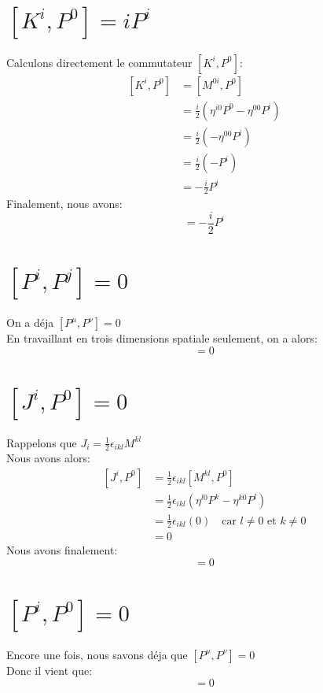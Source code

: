 \documentclass[12pt, a4paper]{article}
\begin{document}
 \section{\([K^{i},P^{0}]=iP^{i}\)}
 Calculons directement le commutateur \([K^{i},P^{0}]\):
 \begin{equation}
 	\begin{split}
 		[K^{i},P^{0}]
 		&=[M^{0i}, P^{0}]\\
 		&=\frac{i}{2}(\eta^{i0}P^{0}-\eta^{00}P^{i})\\
 		&=\frac{i}{2}(-\eta^{00}P^{i})\\
 		&=\frac{i}{2}(-P^{i})\\
 		&=-\frac{i}{2}P^{i}
 	\end{split}
\end{equation}
Finalement, nous avons: 
\begin{equation}
	[K^{i},P^{0}]=-\frac{i}{2}P^{i}
\end{equation}

\section{\([P^{i},P^{j}]=0\)}
On a déja \([P^{\mu},P^{\nu}]=0\)\\
En travaillant en trois dimensions spatiale seulement, on a alors: 
\begin{equation}
	[P^{i},P^{j}]=0
\end{equation}

\section{\([J^{i},P^{0}]=0\)}
Rappelons que \(J_{i}=\frac{1}{2}\epsilon_{ikl}M^{kl}\)\\
Nous avons alors:
\begin{equation}
	\begin{split}
  		[J^{i},P^{0}]
  		&=\frac{1}{2}\epsilon_{ikl}[M^{kl},P^{0}]\\
  		&=\frac{1}{2}\epsilon_{ikl}(\eta^{l0}P^{k}-\eta^{k0}P^{l})\\
  		&=\frac{1}{2}\epsilon_{ikl}(0) \quad \text{car \(l\neq0 \) et \(k\neq0 \)} \\
  		&=0 
	\end{split}
\end{equation}
Nous avons finalement:
\begin{equation}
	[J^{i},P^{0}]=0
\end{equation}

\section{\([P^{i},P^{0}]=0\)}
Encore une fois, nous savons déja que \([P^{\mu},P^{\nu}]=0\)\\
Donc il vient que:
\begin{equation}
	[P^{i},P^{0}]=0
\end{equation}
\end{document}
